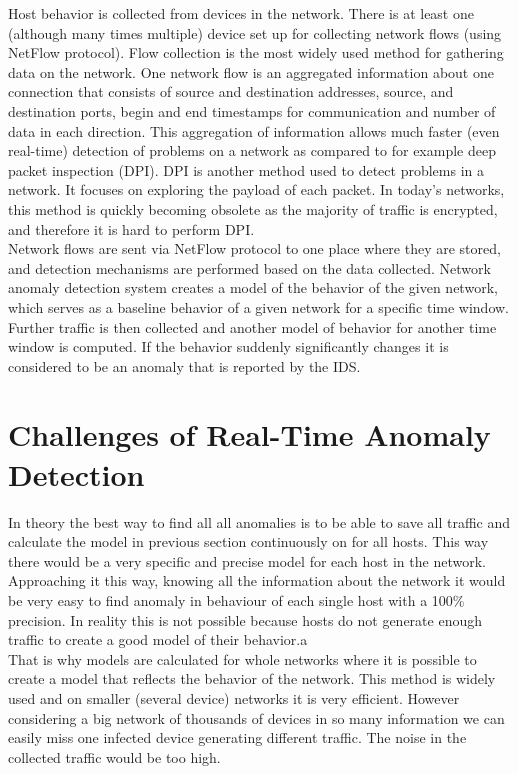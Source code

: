 \documentclass[thesis=B,english]{FITthesis}[2012/10/20]
\begin{document}
Host behavior is collected from devices in the network.
There is at least one (although many times multiple) device set up for collecting network flows (using NetFlow protocol).
Flow collection is the most widely used method for gathering data on the network. %
One network flow is an aggregated information about one connection that consists of source and destination addresses, source, and destination ports, begin and end timestamps for communication and number of data in each direction. %
This aggregation of information allows much faster (even real-time) detection of problems on a network as compared to for example deep packet inspection (DPI).
DPI is another method used to detect problems in a network.
It focuses on exploring the payload of each packet.
In today's networks, this method is quickly becoming obsolete as the majority of traffic is encrypted, and therefore it is hard to perform DPI. \\ 

Network flows are sent via NetFlow protocol to one place where they are stored, and detection mechanisms are performed based on the data collected.
Network anomaly detection system creates a model of the behavior of the given network, which serves as a baseline behavior of a given network for a specific time window.
Further traffic is then collected and another model of behavior for another time window is computed.
If the behavior suddenly significantly changes it is considered to be an anomaly that is reported by the IDS. \\ %

\section{Challenges of Real-Time Anomaly Detection}
In theory the best way to find all all anomalies is to be able to save all traffic and calculate the model in previous section continuously on for all hosts.
This way there would be a very specific and precise model for each host in the network.
Approaching it this way, knowing all the information about the network it would be very easy to find anomaly in behaviour of each single host with a 100\% precision.
In reality this is not possible because hosts do not generate enough traffic to create a good model of their behavior.a \\

That is why models are calculated for whole networks where it is possible to create a model that reflects the behavior of the network.
This method is widely used and on smaller (several device) networks it is very efficient.
However considering a big network of thousands of devices in so many information we can easily miss one infected device generating different traffic.
The noise in the collected traffic would be too high. \\
\end{document}
